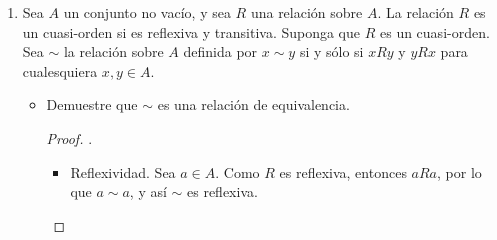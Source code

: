 \documentclass[letterpaper,11pt]{article}
\begin{document}
\begin{enumerate}
    \begin{proof} .
        \begin{itemize}
            \item Reflexividad. Sea $a ∈ ℕ$. Es claro que $a = a^{1}$, por lo 
            que $a \preceq a$.

            \item Antisimetría. Si $a \preceq b$ y $b \preceq a$ entonces 
            existen $r, s ∈ ℕ$ tales que $b = a^{r}$ y $a = b^{s}$. Sustituyendo
            el valor de $b$ de la primera expresión en la segunda obtenemos que 
            $a = (a^{r})^{s} = a^{rs}$, lo que implica que $rs = 1$. Como $r$ y 
            $s$ son naturales, entonces forzosamente $r = 1 = s$, por lo que 
            $a = b$. 

            \item Transitividad. Si $a \preceq b$ y $b \preceq c$ entonces 
            $b = a^{r}$ y $c = b^{s}$ para algunos $r, s ∈ ℕ$. Sustituyendo 
            el valor de $b$ de la  primer expresión en la segunda obtenemos que 
            $c = (a^{r})^{s}$ de donde $c = a^{r ⋅ s}$, lo que implica que 
            $a \preceq c$. 
        \end{itemize}

        El orden $\preceq$ no es total. Como $2 \not = 3$ y sólo estan
        permitidos los exponentes naturales, entonces no existe $k ∈ ℕ$ tal que 
        $2^{k} = 3$, o que $3^{k} = 2$, por lo que $2 \not \preceq 3$ y 
        $3 \not \preceq 2$. Así, $\preceq$ no es tricotómica, y por lo tanto, no 
        es un orden total.

    \end{proof}

    \item Sea $A$ un conjunto no vacío, y sea $R$ una relación sobre $A$. La 
    relación $R$ es un cuasi-orden si es reflexiva y transitiva. Suponga que 
    $R$ es un cuasi-orden. Sea $\sim$ la relación sobre $A$ definida por 
    $x \sim y$ si y sólo si $xRy$ y $yRx$ para cualesquiera $x, y \in A$.

    \begin{itemize}
        \item Demuestre que $\sim$ es una relación de equivalencia.

        \begin{proof} .
            \begin{itemize}
                \item Reflexividad. Sea $a ∈ A$. Como $R$ es reflexiva, entonces 
                $aRa$, por lo que $a \sim a$, y así $\sim$ es reflexiva.


\end{itemize}
\end{proof}
\end{itemize}
\end{enumerate}
\end{document}
